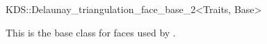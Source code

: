 

\begin{ccRefClass}{KDS::Delaunay_triangulation_face_base_2<Traits, Base>}  %


\ccDefinition
  
This is the base class for faces used by .



\end{ccRefClass}


